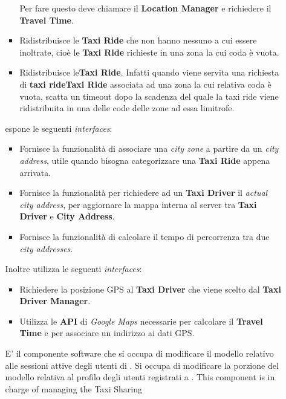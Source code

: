 \begin{itemize}
\begin{itemize}
\begin{itemize}
			Per fare questo deve chiamare il \textbf{Location Manager} e richiedere il \textbf{Travel Time}.
			\item Ridistribuisce le \textbf{Taxi Ride} che non hanno nessuno a cui essere inoltrate, cioè le \textbf{Taxi Ride} richieste in una zona la cui coda è vuota.
			\item Ridistribuisce le\textbf{Taxi Ride}. 
			Infatti quando viene servita una richiesta di \textbf{taxi rideTaxi Ride} associata ad una zona la cui relativa coda è vuota, scatta un timeout dopo la scadenza del quale la taxi ride viene ridistribuita in una delle code delle zone ad essa limitrofe.
		\end{itemize}
			espone le seguenti \textit{interfaces}:
		\begin{itemize}
			\item Fornisce la funzionalità di associare una \textit{city zone} a partire da un \textit{city address}, utile quando bisogna categorizzare una \textbf{Taxi Ride} appena arrivata.
			\item Fornisce la funzionalità per richiedere ad un \textbf{Taxi Driver} il \textit{actual city address}, per aggiornare la mappa interna al server tra \textbf{Taxi Driver} e \textbf{City Address}.
			\item Fornisce la funzionalità di calcolare il tempo di percorrenza tra due \textit{city addresses}.
		\end{itemize}
		Inoltre utilizza le seguenti \textit{interfaces}:
		\begin{itemize}
			\item Richiedere la posizione GPS al \textbf{Taxi Driver} che viene scelto dal \textbf{Taxi Driver Manager}.
			\item Utilizza le \textbf{API} di \textit{Google Maps} necessarie per calcolare il \textbf{Travel Time} e per associare un indirizzo ai dati GPS.	
		\end{itemize}
		 E' il componente software che si occupa di modificare il modello relativo alle sessioni attive degli utenti di \myTaxiService{}.
		 Si occupa di modificare la porzione del modello relativa al profilo degli utenti registrati a \myTaxiService{}.
		This component is in charge of managing the Taxi Sharing
	\end{itemize}
	

\end{itemize}
